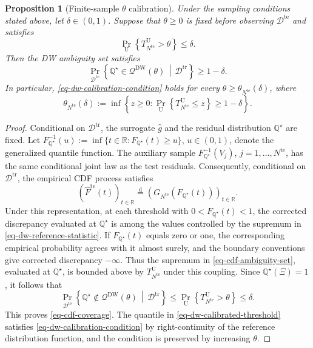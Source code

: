 \documentclass[review,11pt,3p,authoryear,nopreprintline]{elsarticle}
\newtheorem{proposition}{Proposition}
\begin{document}
\begin{proposition}[Finite-sample $\theta$ calibration]
  \label{proposition-01}
  Under the sampling conditions stated above, let $\delta\in(0,1)$. Suppose that $\theta\ge0$ is fixed before observing $\mathcal D^{\mathrm{te}}$ and satisfies
  \begin{equation}
    \Pr_{\mathrm U}\left\{T_{N^{\mathrm{te}}}^{\mathrm U}>\theta\right\}\le\delta.
    \label{eq-dw-calibration-condition}
  \end{equation}
  Then the DW ambiguity set satisfies
  \begin{equation}
    \Pr_{\mathcal D^{\mathrm{te}}}\left\{\mathbb Q^\star\in\mathscr Q^{\mathrm{DW}}(\theta)\,\middle|\,\mathcal D^{\mathrm{tr}}\right\}\ge1-\delta.
    \label{eq-cdf-coverage}
  \end{equation}
  In particular, \eqref{eq-dw-calibration-condition} holds for every $\theta\ge\theta_{N^{\mathrm{te}}}(\delta)$, where
  \begin{equation}
    \theta_{N^{\mathrm{te}}}(\delta):=\inf\left\{z\ge0:\Pr_{\mathrm U}\left\{T_{N^{\mathrm{te}}}^{\mathrm U}\le z\right\}\ge1-\delta\right\}.
    \label{eq-dw-calibrated-threshold}
  \end{equation}
\end{proposition}
\begin{proof}
  Conditional on $\mathcal D^{\mathrm{tr}}$, the surrogate $\hat g$ and the residual distribution $\mathbb Q^\star$ are fixed. Let $F_{\mathbb Q^\star}^{-1}(u):=\inf\{t\in\mathbb R:F_{\mathbb Q^\star}(t)\ge u\}$, $u\in(0,1)$, denote the generalized quantile function. The auxiliary sample $F_{\mathbb Q^\star}^{-1}(V_j)$, $j=1,\ldots,N^{\mathrm{te}}$, has the same conditional joint law as the test residuals. Consequently, conditional on $\mathcal D^{\mathrm{tr}}$, the empirical CDF process satisfies
  \[
    \left(\widehat F^{\mathrm{te}}(t)\right)_{t\in\mathbb R}\overset{\mathrm d}{=}\left(G_{N^{\mathrm{te}}}\!\left(F_{\mathbb Q^\star}(t)\right)\right)_{t\in\mathbb R}.
  \]
  Under this representation, at each threshold with $0<F_{\mathbb Q^\star}(t)<1$, the corrected discrepancy evaluated at $\mathbb Q^\star$ is among the values controlled by the supremum in \eqref{eq-dw-reference-statistic}. If $F_{\mathbb Q^\star}(t)$ equals zero or one, the corresponding empirical probability agrees with it almost surely, and the boundary conventions give corrected discrepancy $-\infty$. Thus the supremum in \eqref{eq-cdf-ambiguity-set}, evaluated at $\mathbb Q^\star$, is bounded above by $T_{N^{\mathrm{te}}}^{\mathrm U}$ under this coupling. Since $\mathbb Q^\star(\Xi)=1$, it follows that
  \[
    \Pr_{\mathcal D^{\mathrm{te}}}\left\{\mathbb Q^\star\notin\mathscr Q^{\mathrm{DW}}(\theta)\,\middle|\,\mathcal D^{\mathrm{tr}}\right\}
    \le\Pr_{\mathrm U}\left\{T_{N^{\mathrm{te}}}^{\mathrm U}>\theta\right\}\le\delta.
  \]
  This proves \eqref{eq-cdf-coverage}. The quantile in \eqref{eq-dw-calibrated-threshold} satisfies \eqref{eq-dw-calibration-condition} by right-continuity of the reference distribution function, and the condition is preserved by increasing $\theta$.
\end{proof}
\end{document}
